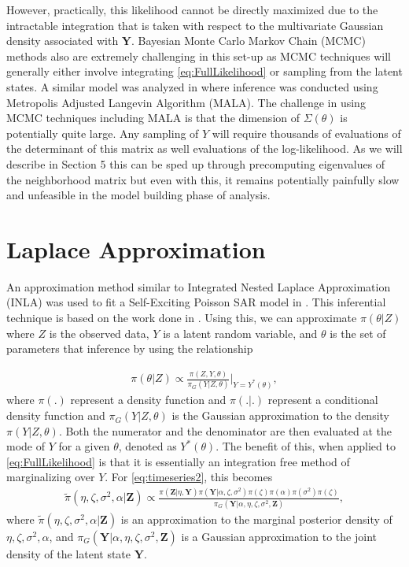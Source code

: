 \documentclass[11pt]{isuthesis}
\begin{document}
	However, practically, this likelihood cannot be directly maximized due to the intractable integration that is taken with respect to the multivariate Gaussian density associated with $\boldsymbol{Y}$.   Bayesian Monte Carlo Markov Chain (MCMC) methods also are extremely challenging in this set-up as MCMC techniques will generally either involve integrating \eqref{eq:FullLikelihood} or sampling from the latent states.  A similar model was analyzed in \cite{mohler2013modeling} where inference was conducted using Metropolis Adjusted Langevin Algorithm (MALA).  The challenge in using MCMC techniques including MALA is that the dimension of $\Sigma(\theta)$ is potentially quite large.  Any sampling of $Y$ will require thousands of evaluations of the determinant of this matrix as well evaluations of the log-likelihood.  As we will describe in Section 5 this can be sped up through precomputing eigenvalues of the neighborhood matrix but even with this, it remains potentially painfully slow and unfeasible in the model building phase of analysis.
	
	\section{Laplace Approximation}
	
	An approximation method similar to Integrated Nested Laplace Approximation (INLA) was used to fit a Self-Exciting Poisson SAR model in \cite{2017arXiv170308429C}.  This inferential technique is based on the work done in \cite{tierney1986accurate}.  Using this, we can approximate $\pi(\theta|Z)$ where $Z$ is the observed data, $Y$ is a latent random variable, and $\theta$ is the set of parameters that inference by using the relationship
	
	\begin{align}
	\pi(\theta|Z)\propto \frac{ \pi(Z,Y,\theta)}{\pi_G(Y|Z,\theta)}\bigg\rvert_{Y=Y^*(\theta)},
	\end{align}
	where $\pi(.)$ represent a density function and $\pi(.|.)$ represent a conditional density function and $\pi_G(Y|Z,\theta)$ is the Gaussian approximation to the density $\pi(Y|Z,\theta)$. Both the numerator and the denominator are then evaluated at the mode of $Y$ for a given $\theta$, denoted as $Y^*(\theta)$.  The benefit of this, when applied to \eqref{eq:FullLikelihood} is that it is essentially an integration free method of marginalizing over $Y$.  For \eqref{eq:timeseries2}, this becomes
	\begin{align}
	\tilde{\pi}(\eta,\zeta,\sigma^2,\alpha|\boldsymbol{Z})\propto \frac{\pi(\boldsymbol{Z}|\eta,\boldsymbol{Y})\pi(\boldsymbol{Y}|\alpha,\zeta,\sigma^2)\pi(\zeta)\pi(\alpha)\pi(\sigma^2)\pi(\zeta)}{\pi_G(\boldsymbol{Y}|\alpha,\eta,\zeta,\sigma^2,\boldsymbol{Z})} \label{eq:INLA},
	\end{align}
	where $\tilde{\pi}(\eta,\zeta,\sigma^2,\alpha|\boldsymbol{Z})$ is an approximation to the marginal posterior density of $\eta,\zeta,\sigma^2,\alpha$, and $\pi_G(\boldsymbol{Y}|\alpha,\eta,\zeta,\sigma^2,\boldsymbol{Z})$ is a Gaussian approximation to the joint density of the latent state $\boldsymbol{Y}$. 
	
\end{document}
